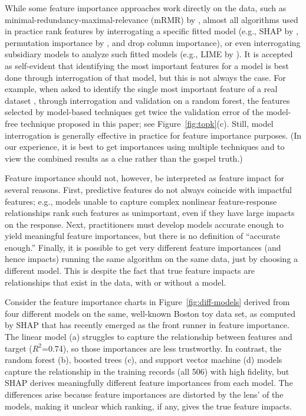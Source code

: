 \documentclass[11pt]{article}
\newcommand{\figref}[1]{Figure~\ref{#1}}
\begin{document}
While some feature importance approaches work directly on the data, such as minimal-redundancy-maximal-relevance (mRMR) by \cite{mRMR}, almost all algorithms used in practice rank features by interrogating a specific fitted model (e.g., SHAP by \citealt{shap}, permutation importance by \citealt{RF}, and drop column importance), or even interrogating subsidiary models to analyze such fitted models (e.g., LIME by \citealt{lime}). It is accepted as self-evident that identifying the most important features for a model is best done through interrogation of that  model, but this is not always the case.  For example, when asked to identify the single most important feature of a real dataset \citep{bulldozer}, through interrogation and validation on a random forest, the features selected by model-based techniques get twice the validation error of the model-free technique proposed in this paper; see \figref{fig:topk}(c). Still, model interrogation is generally effective in practice for feature importance purposes. (In our experience, it is best to get importances using multiple techniques and to view the combined results as a clue rather than the gospel truth.)

Feature importance should not, however, be interpreted as feature impact for several reasons. First, predictive features do not always coincide with impactful features; e.g., models unable to capture complex nonlinear feature-response relationships rank such features as unimportant, even if they have large impacts on the response. Next, practitioners must develop models accurate enough to yield meaningful feature importances, but there is no definition of ``accurate enough.'' Finally, it is possible to get very different feature importances (and hence impacts) running the same algorithm on the same data, just by choosing a different model. This is despite the fact that true feature impacts are relationships that exist in the data, with or without a model.

Consider the feature importance charts in \figref{fig:diff-models} derived from four different models on the same, well-known Boston toy data set, as computed by SHAP that has recently emerged as the front runner in feature importance. The linear model (a) struggles to capture the relationship between features and target ($R^2$=0.74), so those importances are less trustworthy.  In contrast, the random forest (b), boosted trees (c), and support vector machine (d) models capture the relationship in the training records (all 506) with high fidelity, but SHAP derives meaningfully different feature importances from each model. The differences arise because feature importances are distorted by the lens' of the models, making it unclear which ranking, if any, gives the true feature impacts. 
\end{document}
